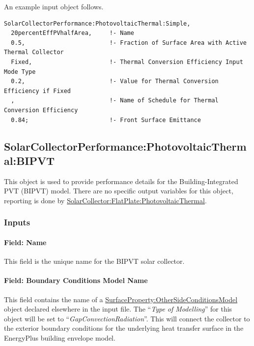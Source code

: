 An example input object follows.

\begin{lstlisting}
SolarCollectorPerformance:PhotovoltaicThermal:Simple,
  20percentEffPVhalfArea,     !- Name
  0.5,                        !- Fraction of Surface Area with Active Thermal Collector
  Fixed,                      !- Thermal Conversion Efficiency Input Mode Type
  0.2,                        !- Value for Thermal Conversion Efficiency if Fixed
  ,                           !- Name of Schedule for Thermal Conversion Efficiency
  0.84;                       !- Front Surface Emittance
\end{lstlisting}

\subsection{SolarCollectorPerformance:PhotovoltaicThermal:BIPVT}\label{solarcollectorperformancephotovoltaicthermalBIPVT}

This object is used to provide performance details for the Building-Integrated PVT (BIPVT) model. There are no specific output variables for this object, reporting is done by \hyperref[solarcollectorflatplatephotovoltaicthermal]{SolarCollector:FlatPlate:PhotovoltaicThermal}.


\subsubsection{Inputs}\label{BIPVT-Inputs}

\paragraph{Field: Name}\label{BIPVT-field-name}

This field is the unique name for the BIPVT solar collector.

\paragraph{Field: Boundary Conditions Model Name}\label{BIPVT-field-BC}

This field contains the name of a \hyperref[surfacepropertyothersideconditionsmodel]{SurfaceProperty:OtherSideConditionsModel} object declared elsewhere in the input file. The “\textit{Type of Modelling}” for this object will be set to “\textit{GapConvectionRadiation}”. This will connect the collector to the exterior boundary conditions for the underlying heat transfer surface in the EnergyPlus building envelope model.


